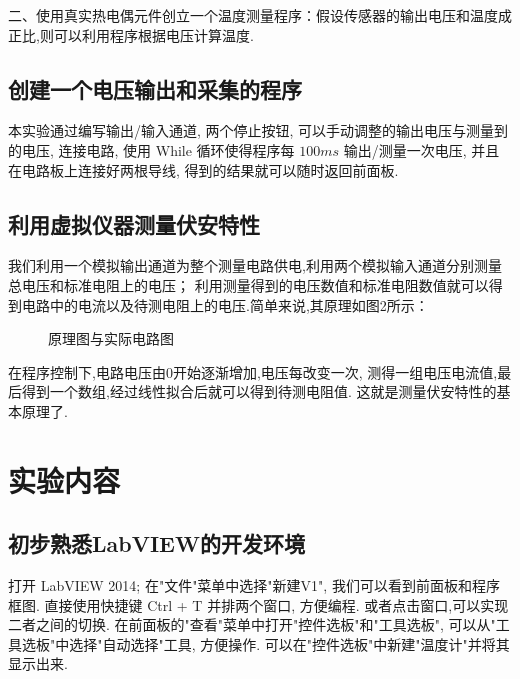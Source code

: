 \documentclass[11pt]{article}
\begin{document}
二、使用真实热电偶元件创立一个温度测量程序：假设传感器的输出电压和温度成正比,则可以利用程序根据电压计算温度.

\subsection{创建一个电压输出和采集的程序}
本实验通过编写输出/输入通道, 两个停止按钮, 可以手动调整的输出电压与测量到的电压, 连接电路, 
使用 While 循环使得程序每 $100 {ms}$ 输出/测量一次电压, 
并且在电路板上连接好两根导线, 得到的结果就可以随时返回前面板.

\subsection{利用虚拟仪器测量伏安特性}

我们利用一个模拟输出通道为整个测量电路供电,利用两个模拟输入通道分别测量总电压和标准电阻上的电压；
利用测量得到的电压数值和标准电阻数值就可以得到电路中的电流以及待测电阻上的电压.简单来说,其原理如图2所示：


\begin{figure}[htb]
    \centering
    \hspace{0.5cm}
    \caption{原理图与实际电路图}
\end{figure}
在程序控制下,电路电压由0开始逐渐增加,电压每改变一次,
测得一组电压电流值,最后得到一个数组,经过线性拟合后就可以得到待测电阻值.
这就是测量伏安特性的基本原理了.

\section{实验内容}
\subsection{初步熟悉LabVIEW的开发环境}
打开 LabVIEW 2014; 在"文件"菜单中选择"新建V1", 我们可以看到前面板和程序框图. 
直接使用快捷键 Ctrl + T 并排两个窗口, 方便编程. 或者点击窗口,可以实现二者之间的切换.
在前面板的"查看"菜单中打开"控件选板"和"工具选板", 可以从"工具选板"中选择"自动选择"工具, 方便操作. 
可以在"控件选板"中新建"温度计"并将其显示出来. 
\end{document}
